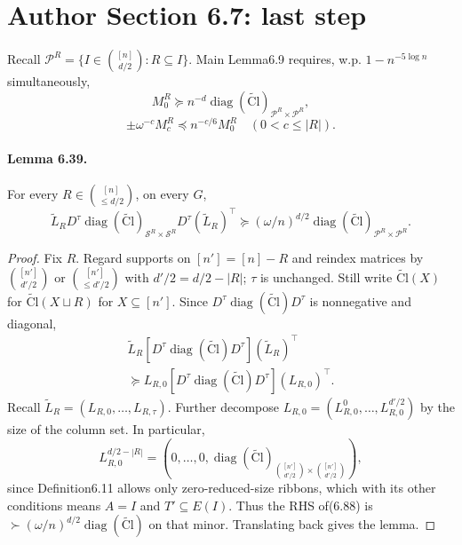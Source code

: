 \documentclass[10pt,a4paper]{article}
\begin{document}
\section*{Author Section 6.7: last step}
Recall $\mathcal P^R=\{I\in\binom{[n]}{d/2}:R\subseteq I\}$. Main Lemma6.9 requires, w.p. $1-n^{-5\log n}$ simultaneously,
\[M_0^R\succeq n^{-d}\operatorname{diag}(\widetilde{\mathrm{Cl}})_{\mathcal P^R\times\mathcal P^R},\tag{6.86}\]
\[\pm\omega^{-c}M_c^R\preceq n^{-c/6}M_0^R\quad(0<c\le|R|).\tag{6.87}\]
\paragraph{Lemma 6.39.} For every $R\in\binom{[n]}{\le d/2}$, on every $G$,
\[\widetilde L_RD^\tau\operatorname{diag}(\widetilde{\mathrm{Cl}})_{\mathcal S^R\times\mathcal S^R}D^\tau(\widetilde L_R)^\top\succeq(\omega/n)^{d/2}\operatorname{diag}(\widetilde{\mathrm{Cl}})_{\mathcal P^R\times\mathcal P^R}.\]
\begin{proof}Fix $R$. Regard supports on $[n']=[n]-R$ and reindex matrices by $\binom{[n']}{d'/2}$ or $\binom{[n']}{\le d'/2}$ with $d'/2=d/2-|R|$; $\tau$ is unchanged. Still write $\widetilde{\mathrm{Cl}}(X)$ for $\widetilde{\mathrm{Cl}}(X\sqcup R)$ for $X\subseteq[n']$. Since $D^\tau\operatorname{diag}(\widetilde{\mathrm{Cl}})D^\tau$ is nonnegative and diagonal,
\begin{multline*}\widetilde L_R[D^\tau\operatorname{diag}(\widetilde{\mathrm{Cl}})D^\tau](\widetilde L_R)^\top\\\succeq L_{R,0}[D^\tau\operatorname{diag}(\widetilde{\mathrm{Cl}})D^\tau](L_{R,0})^\top.\tag{6.88}\end{multline*}
Recall $\widetilde L_R=(L_{R,0},\ldots,L_{R,\tau})$. Further decompose $L_{R,0}=(L_{R,0}^0,\ldots,L_{R,0}^{d'/2})$ by the size of the column set. In particular,
\[L_{R,0}^{d/2-|R|}=(0,\ldots,0,\operatorname{diag}(\widetilde{\mathrm{Cl}})_{\binom{[n']}{d'/2}\times\binom{[n']}{d'/2}}),\]
since Definition6.11 allows only zero-reduced-size ribbons, which with its other conditions means $A=I$ and $T'\subseteq E(I)$. Thus the RHS of(6.88) is $\succ(\omega/n)^{d/2}\operatorname{diag}(\widetilde{\mathrm{Cl}})$ on that minor. Translating back gives the lemma.\end{proof}
\end{document}
